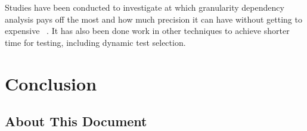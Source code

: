 \documentclass{cslthse-msc}
\begin{document}
Studies have been conducted to investigate at which granularity dependency analysis pays off the most and how much precision it can have without getting to expensive ~\cite{DBLP:conf/sigsoft/LegunsenHSLZM16}. It has also been done work in other techniques to achieve shorter time for testing, including dynamic test selection.

\chapter[Conclusion]{Conclusion}

\begin{appendices}
\chapter{About This Document}
\end{appendices}
\end{document}

